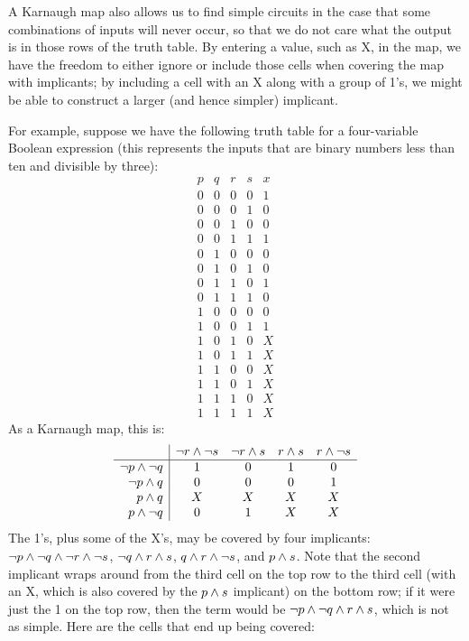 A Karnaugh map also allows us to find simple circuits in the case that some combinations of inputs will never occur, so that we do not care what the output is in those rows of the truth table. By entering a  value, such as X, in the map, we have the freedom to either ignore or include those cells when covering the map with implicants; by including a cell with an X along with a group of 1's, we might be able to construct a larger (and hence simpler) implicant.

For example, suppose we have the following truth table for a four-variable Boolean expression (this represents the inputs that are binary numbers less than ten and divisible by three):
\[ \begin{array}{cccc|c}
p & q & r & s & x\\ \hline
0 & 0 & 0 & 0 & 1\\
0 & 0 & 0 & 1 & 0\\
0 & 0 & 1 & 0 & 0\\
0 & 0 & 1 & 1 & 1\\
0 & 1 & 0 & 0 & 0\\
0 & 1 & 0 & 1 & 0\\
0 & 1 & 1 & 0 & 1\\
0 & 1 & 1 & 1 & 0\\
1 & 0 & 0 & 0 & 0\\
1 & 0 & 0 & 1 & 1\\
1 & 0 & 1 & 0 & X\\
1 & 0 & 1 & 1 & X\\
1 & 1 & 0 & 0 & X\\
1 & 1 & 0 & 1 & X\\
1 & 1 & 1 & 0 & X\\
1 & 1 & 1 & 1 & X
\end{array} \]
As a Karnaugh map, this is:
\[ \begin{array}{r|cccc}
& \lnot{r}\wedge\lnot{s} & \lnot{r}\wedge s & r\wedge s & r\wedge\lnot{s}\\ \hline
\lnot{p}\wedge\lnot{q} & 1 & 0 & 1 & 0\\
\lnot{p}\wedge q & 0 & 0 & 0 & 1\\
p\wedge q & X & X & X & X\\
p\wedge\lnot{q} & 0 & 1 & X & X
\end{array} \]
The 1's, plus some of the X's, may be covered by four implicants: $\lnot{p}\wedge\lnot{q}\wedge\lnot{r}\wedge\lnot{s}$, $\lnot{q}\wedge r\wedge s$, $q\wedge r\wedge\lnot{s}$, and $p\wedge s$. Note that the second implicant wraps around from the third cell on the top row to the third cell (with an X, which is also covered by the $p\wedge s$ implicant) on the bottom row; if it were just the 1 on the top row, then the term would be $\lnot{p}\wedge\lnot{q}\wedge r\wedge s$, which is not as simple. Here are the cells that end up being covered:
